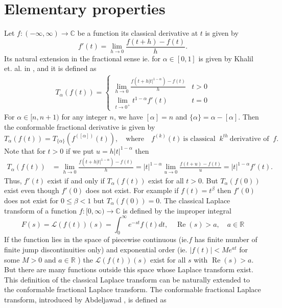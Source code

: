 \documentclass[two side,reqno,12pt]{amsart}
\numberwithin{equation}{section}
\theoremstyle{definition}
\begin{document}
	\section{Elementary properties }
Let $f:(-\infty,\infty)\rightarrow \mathbb{C}$ be a function
its classical derivative at $t$ is given by
\[f'(t)=\lim_{h\rightarrow 0}\frac{f(t+h)-f(t)}{h}.\]
Its natural extension in the fractional sense ie. for $\alpha \in [0,1]$  is given by Khalil et. al. in \cite{khalil2014}, and it is defined as
\begin{align}
T_{\alpha}(f(t))=\begin{cases}
\displaystyle 	\lim_{h\rightarrow 0}\frac{f(t+h|t|^{1-\alpha})-f(t)}{h} & t>0\\
\displaystyle 	\lim_{t\rightarrow 0^+} t^{1-\alpha}f'(t) & t=0
\end{cases}
\end{align}
For $\alpha\in [n,n+1)$ for any integer $n$, we have $[\alpha]=n$ and $\{\alpha\}=\alpha-[\alpha]$. Then the conformable fractional derivative is given by 
\[T_{\alpha}(f(t))=T_{\{\alpha\}}(f^{([\alpha])}(t)),\quad\text{where}\quad f^{(k)}(t)~\text{is classical }~k^{th}~\text{derivative of }~f.\]
Note that for $t>0$ if we put $ u=h|t|^{1-\alpha}$
then 
\begin{align*}
T_{\alpha}(f(t))&=\lim_{h\rightarrow 0}\frac{f(t+h|t|^{1-\alpha})-f(t)}{h}
=|t|^{1-\alpha}\lim_{u\rightarrow 0}\frac{f(t+u)-f(t)}{u}
=|t|^{1-\alpha} f'(t).
\end{align*}
Thus, $f'(t)$ exist if and only if $T_{\alpha}(f(t))$ exist for all $t>0$. But $T_{\alpha}(f(0))$ exist even though $f'(0)$ does not exist. For example if $f(t)=t^{\beta}$ then $f'(0)$ does not exist for $0\leq \beta<1$ but $T_{\alpha}(f(0))=0$.
The classical Laplace transform of a function $f:[0, \infty)\rightarrow \mathbb C$ is defined by the improper integral
\[ F(s)=\mathcal{L}(f(t))(s)=\int_{0}^{\infty} e^{-st}f(t)dt,\quad \operatorname{Re}(s) > a,\quad a\in \mathbb{R}\] 
If the function lies in the space of piecewise continuous (ie.$f$ has finite number of finite jump discontinuities only) and exponential order (ie. $|f(t)|<Me^{at}$ for some $M>0$ and $a\in \mathbb R$ ) the $\mathcal{L}(f(t))(s)$ exist for all $s$ with  $\operatorname{Re}(s) > a$. But there are many functions outside this space whose Laplace transform exist.
This definition of the classical Laplace transform can be naturally extended to the conformable fractional Laplace transform. The conformable fractional Laplace transform, introduced by Abdeljawad \cite{abdeljawad2015}, is defined as
\end{document}
